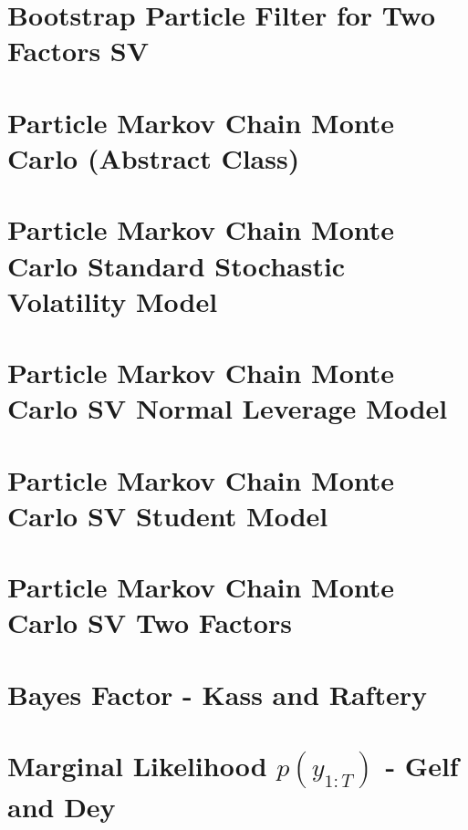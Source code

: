 \documentclass[11pt,a4,twosided,singlespacing,titlepagenumber=on]{scrreprt}
\numberwithin{equation}{chapter} %
\theoremstyle{remark}
\begin{document}
\section{Bootstrap Particle Filter for Two Factors SV}


\section{Particle Markov Chain Monte Carlo (Abstract Class)}


\section{Particle Markov Chain Monte Carlo Standard Stochastic Volatility Model}


\section{Particle Markov Chain Monte Carlo SV Normal Leverage Model}


\section{Particle Markov Chain Monte Carlo SV Student Model}


\section{Particle Markov Chain Monte Carlo SV Two Factors}


\section{Bayes Factor - Kass and Raftery}


\section{Marginal Likelihood $p(y_{1:T})$ - Gelf and Dey}

\end{document}
